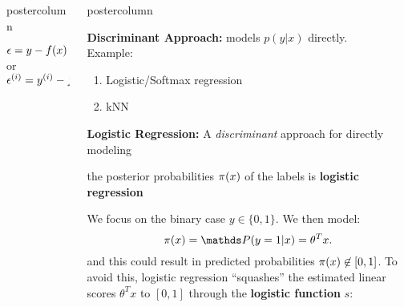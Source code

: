 \documentclass{beamer}
\newlength{\columnheight} %
\begin{document}
\begin{frame}[fragile]{}
\begin{columns}
\begin{column}{.31\textwidth}
\begin{beamercolorbox}[center]{postercolumn}
\begin{minipage}{.98\textwidth}
{\begin{myblock}{}
\begin{enumerate}
                        \end{enumerate}
                        \hspace*{1ex}
						\begin{codebox}
				            $\epsilon = y - f(x)$ or $\epsilon^{(i)} = y^{(i)} - f(x^{(i)})$
						\end{codebox}
					\end{myblock}
				}
			\end{minipage}
		\end{beamercolorbox}
	\end{column}
	\begin{column}{.31\textwidth}
		\begin{beamercolorbox}[center]{postercolumn}
			\begin{minipage}{.98\textwidth}
				\parbox[t][\columnheight]{\textwidth}{
				    \begin{myblock}{ }
				        \hspace*{1ex}\textbf{Discriminant Approach: }models $p(y|x)$ directly. \\\hspace*{1ex}Example: 
						\begin{enumerate}
                        \item Logistic/Softmax regression
                        \item kNN
                        \end{enumerate}
                        \hspace*{1ex}
						\begin{codebox}
				            \textbf{Logistic Regression: }A \emph{discriminant} approach for directly modeling
						\end{codebox}
						\begin{codebox}
				            the posterior probabilities $\pi(x)$ of the labels is \textbf{logistic regression}
						\end{codebox}
						\hspace*{1ex}We focus on the binary case $y \in \{0, 1\}$. We then model: \[ \pix = \post = \theta^T x .\] 
						\hspace*{1ex}and this could result in predicted probabilities $\pi(x) \not\in [0,1]$. To avoid \hspace*{1ex}this, logistic regression \enquote{squashes} the estimated linear scores $\theta^T x$ to \hspace*{1ex}$[0,1]$ through the \textbf{logistic function} $s$:

\end{myblock}}
\end{minipage}
\end{beamercolorbox}
\end{column}
\end{columns}
\end{frame}
\end{document}
